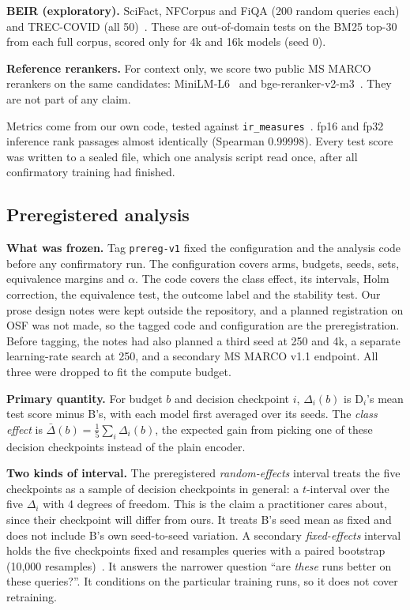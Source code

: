 \documentclass[journal]{IEEEtran}
\begin{document}
\textbf{BEIR (exploratory).} SciFact, NFCorpus and FiQA (200 random queries each) and TREC-COVID (all 50)~\cite{thakur2021beir}. These are out-of-domain tests on the BM25 top-30 from each full corpus, scored only for 4k and 16k models (seed 0).

\textbf{Reference rerankers.} For context only, we score two public MS MARCO rerankers on the same candidates: MiniLM-L6~\cite{wang2020minilm,reimers2019sbert} and bge-reranker-v2-m3~\cite{chen2024bgem3}. They are not part of any claim.

Metrics come from our own code, tested against \texttt{ir\_measures}~\cite{macavaney2022irmeasures}. fp16 and fp32 inference rank passages almost identically (Spearman 0.99998). Every test score was written to a sealed file, which one analysis script read once, after all confirmatory training had finished.

\subsection{Preregistered analysis}
\label{sec:prereg}

\textbf{What was frozen.} Tag \texttt{prereg-v1} fixed the configuration and the analysis code before any confirmatory run. The configuration covers arms, budgets, seeds, sets, equivalence margins and $\alpha$. The code covers the class effect, its intervals, Holm correction, the equivalence test, the outcome label and the stability test. Our prose design notes were kept outside the repository, and a planned registration on OSF was not made, so the tagged code and configuration are the preregistration. Before tagging, the notes had also planned a third seed at 250 and 4k, a separate learning-rate search at 250, and a secondary MS MARCO v1.1 endpoint. All three were dropped to fit the compute budget.

\textbf{Primary quantity.} For budget $b$ and decision checkpoint $i$, $\Delta_i(b)$ is D$_i$'s mean test score minus B's, with each model first averaged over its seeds. The \emph{class effect} is $\bar\Delta(b)=\frac{1}{5}\sum_{i}\Delta_i(b)$, the expected gain from picking one of these decision checkpoints instead of the plain encoder.

\textbf{Two kinds of interval.} The preregistered \emph{random-effects} interval treats the five checkpoints as a sample of decision checkpoints in general: a $t$-interval over the five $\Delta_i$ with 4 degrees of freedom. This is the claim a practitioner cares about, since their checkpoint will differ from ours. It treats B's seed mean as fixed and does not include B's own seed-to-seed variation. A secondary \emph{fixed-effects} interval holds the five checkpoints fixed and resamples queries with a paired bootstrap (10{,}000 resamples)~\cite{efron1993bootstrap,smucker2007significance}. It answers the narrower question ``are \emph{these} runs better on these queries?''. It conditions on the particular training runs, so it does not cover retraining.
\end{document}
